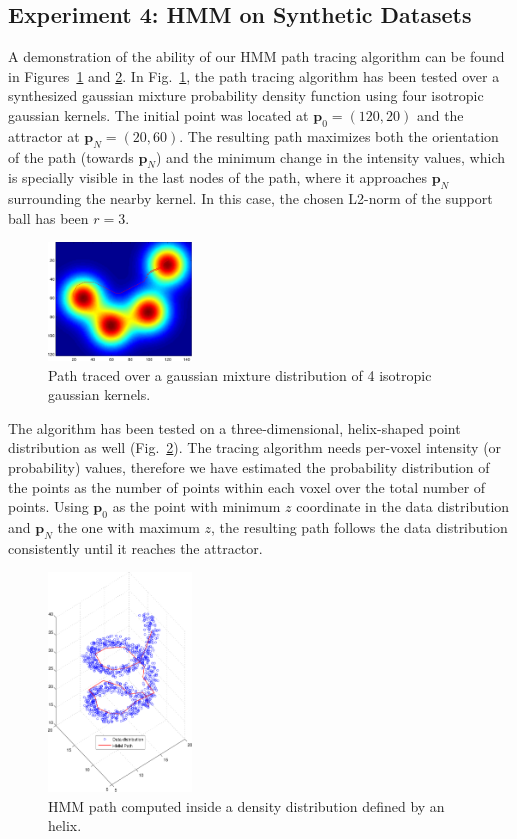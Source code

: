 \subsection{Experiment 4: HMM on Synthetic Datasets}
A demonstration of the ability of our \ac{HMM} path tracing algorithm can be found in Figures~\ref{fig:gaussian} and \ref{fig:spire}. In Fig.~\ref{fig:gaussian}, the path tracing algorithm has been tested over a synthesized gaussian mixture probability density function using four isotropic gaussian kernels. The initial point was located at $\mathbf{p}_0 = (120,20)$ and the attractor at $\mathbf{p}_N = (20, 60)$. The resulting path maximizes both the orientation of the path (towards $\mathbf{p}_N$) and the minimum change in the intensity values, which is specially visible in the last nodes of the path, where it approaches $\mathbf{p}_N$ surrounding the nearby kernel. In this case, the chosen L2-norm of the support ball has been $r=3$. 
\begin{figure}
	\begin{center}
		\includegraphics[width=1.5in]{Graphics/ch6/gaussian}
		\caption{Path traced over a gaussian mixture distribution of 4 isotropic gaussian kernels.}
		\label{fig:gaussian}
	\end{center}
\end{figure}

The algorithm has been tested on a three-dimensional, helix-shaped point distribution as well (Fig.~\ref{fig:spire}). The tracing algorithm needs per-voxel intensity (or probability) values, therefore we have estimated the probability distribution of the points as the number of points within each voxel over the total number of points. Using $\mathbf{p}_0$ as the point with minimum $z$ coordinate in the data distribution and $\mathbf{p}_N$ the one with maximum $z$, the resulting path follows the data distribution consistently until it reaches the attractor. 
\begin{figure}
	\begin{center}
		\includegraphics[width=1.5in]{Graphics/ch6/spire}
		\caption{\ac{HMM} path computed inside a density distribution defined by an helix.}
		\label{fig:spire}
	\end{center}
\end{figure}

